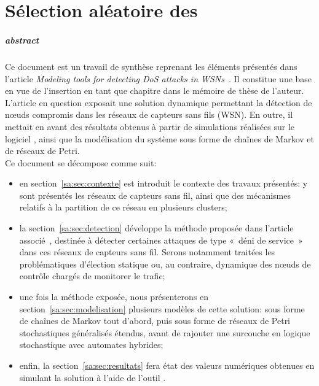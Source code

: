 \chapter{Sélection aléatoire des \cns}\label{chap:sa}

\renewcommand\chapterpath{Main/SelecAleatoire}
\renewcommand\chapterfig{Main/SelecAleatoire/Figures}

\paragraph{abstract}
Ce document est un travail de synthèse reprenant les éléments présentés dans l'article \textit{Modeling tools for detecting DoS attacks in WSNs}~\cite{BMM13}.
Il constitue une base en vue de l'insertion en tant que chapitre dans le mémoire de thèse de l'auteur.\\

L'article en question exposait une solution dynamique permettant la détection de nœuds compromis dans les réseaux de capteurs sans fils (WSN).
En outre, il mettait en avant des résultats obtenus à partir de simulations réalisées sur le logiciel \ns, ainsi que la modélisation du système sous forme de chaînes de Markov et de réseaux de Petri.\\

Ce document se décompose comme suit:
\begin{itemize}
	\item en section~\ref{sa:sec:contexte} est introduit le contexte des travaux présentés: y sont présentés les réseaux de capteurs sans fil, ainsi que des mécanismes relatifs à la partition de ce réseau en plusieurs clusters;
	\item la section~\ref{sa:sec:detection} développe la méthode proposée dans l'article associé~\cite{BMM13}, destinée à détecter certaines attaques de type «~déni de service~» dans ces réseaux de capteurs sans fil. Serons notamment traitées les problématiques d'élection statique ou, au contraire, dynamique des nœuds de contrôle chargés de monitorer le trafic;
	\item une fois la méthode exposée, nous présenterons en section~\ref{sa:sec:modelisation} plusieurs modèles de cette solution: sous forme de chaînes de Markov tout d'abord, puis sous forme de réseaux de Petri stochastiques généralisés étendus, avant de rajouter une surcouche en logique stochastique avec automates hybrides;
	\item enfin, la section~\ref{sa:sec:resultats} fera état des valeurs numériques obtenues en simulant la solution à l'aide de l'outil \ns.
\end{itemize}








